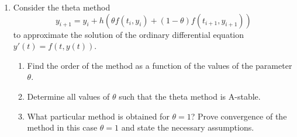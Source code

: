 \documentclass{article}
\begin{document}
\begin{enumerate}
\begin{enumerate}
\item Derive the formula for getting a ``better'' approximation to the root by setting \(x^{n + 1}\) to be the root of the linear approximation to \(f\) obtained from the first two terms of the Taylor Series approximation to \(f\) at \(x^n\).

\item What is the common name for the method you have derived?

\item Consider \(F : \mathbb{R}^n \to \mathbb{R}^n\).  Using the approach in (a), derive a vector iteration for solving \(F(x) = 0\).

\end{enumerate}

{\bf Solution}

\begin{enumerate}
\item The linear approximation to \(f\) at \(x^n\) is \(\ell(x) = f(x^n) + f'(x^n)(x - x^n)\), so we wish to satisfy \(\ell(x^{n + 1}) = 0\), giving \(x^{n + 1} = x^n - f'(x^n)^{-1} f(x^n)\).

\item The common name for this method is Newton's method.

\item All the notation from (a) stands, so we obtain \(x^{n + 1} = x^n - DF(x_n)^{-1} F(x^n)\).

\end{enumerate}



\item Consider the theta method
\[y_{i + 1} = y_i + h \left( \theta f(t_i,y_i) + (1 - \theta) f(t_{i + 1}, y_{i + 1}) \right)\]
to approximate the solution of the ordinary differential equation \(y'(t) = f(t,y(t))\).

\begin{enumerate}
\item Find the order of the method as a function of the values of the parameter \(\theta\).

\item Determine all values of \(\theta\) such that the theta method is A-stable.

\item What particular method is obtained for \(\theta = 1\)?  Prove convergence of the method in this case \(\theta = 1\) and state the necessary assumptions.


\end{enumerate}
\end{enumerate}
\end{document}
